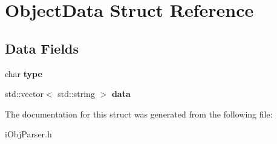 \hypertarget{structObjectData}{
\section{ObjectData Struct Reference}
\label{structObjectData}
}
\subsection*{Data Fields}
\begin{DoxyCompactItemize}
\item 
\hypertarget{structObjectData_a77f1a74deb864606b1b5cc115c2a99a5}{
char {\bfseries type}}
\label{structObjectData_a77f1a74deb864606b1b5cc115c2a99a5}

\item 
\hypertarget{structObjectData_af755ea276bafd67e377e869950c1eb48}{
std::vector$<$ std::string $>$ {\bfseries data}}
\label{structObjectData_af755ea276bafd67e377e869950c1eb48}

\end{DoxyCompactItemize}


The documentation for this struct was generated from the following file:\begin{DoxyCompactItemize}
\item 
iObjParser.h\end{DoxyCompactItemize}
